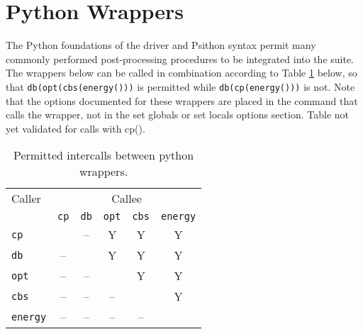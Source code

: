 \newcommand{\hiddensubsubsection}[1]{
\stepcounter{subsubsection}
\subsubsection*{\arabic{section}.\arabic{subsection}.\arabic{subsubsection}\hspace{1em}{#1}}}

\section{Python Wrappers\label{pywrappers}}

The Python foundations of the \PSIfour driver and Psithon syntax permit
many commonly performed post-processing procedures to be integrated into
the \PSIfour suite.
The wrappers below can be called in combination according to Table \ref{table:wrapintercalls}
below, so that \texttt{db(opt(cbs(energy()))} is permitted while
\texttt{db(cp(energy()))} is not.
Note that the options documented for these wrappers are placed in the command 
that calls the wrapper, not in the set globals or set locals options section.
Table not yet validated for calls with cp().

\begin{table}[!htbp]
\begin{footnotesize}
\caption{Permitted intercalls between python wrappers.} \label{table:wrapintercalls}
\parsep 10pt
\begin{center}
\begin{tabular}{lccccc}
\hline\hline
Caller & \multicolumn{5}{c}{Callee} \\
\cline{2-6}
& \texttt{cp} & \texttt{db} & \texttt{opt} & \texttt{cbs} & \texttt{energy} \\
\hline
\texttt{cp}     &    & -- & Y  & Y  & Y \\
\texttt{db}     & -- &    & Y  & Y  & Y \\
\texttt{opt}    & -- & -- &    & Y  & Y \\
\texttt{cbs}    & -- & -- & -- &    & Y \\
\texttt{energy} & -- & -- & -- & -- &   \\
\hline\hline
\end{tabular}
\end{center}
\end{footnotesize}
\end{table}

